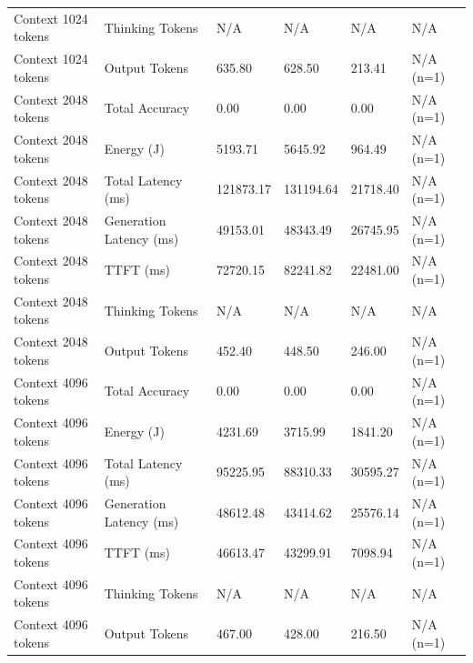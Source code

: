 \begin{table}
\begin{tabular}{llllll}
Context 1024 tokens & Thinking Tokens & N/A & N/A & N/A & N/A \\
Context 1024 tokens & Output Tokens & 635.80 & 628.50 & 213.41 & N/A (n=1) \\
Context 2048 tokens & Total Accuracy & 0.00 & 0.00 & 0.00 & N/A (n=1) \\
Context 2048 tokens & Energy (J) & 5193.71 & 5645.92 & 964.49 & N/A (n=1) \\
Context 2048 tokens & Total Latency (ms) & 121873.17 & 131194.64 & 21718.40 & N/A (n=1) \\
Context 2048 tokens & Generation Latency (ms) & 49153.01 & 48343.49 & 26745.95 & N/A (n=1) \\
Context 2048 tokens & TTFT (ms) & 72720.15 & 82241.82 & 22481.00 & N/A (n=1) \\
Context 2048 tokens & Thinking Tokens & N/A & N/A & N/A & N/A \\
Context 2048 tokens & Output Tokens & 452.40 & 448.50 & 246.00 & N/A (n=1) \\
Context 4096 tokens & Total Accuracy & 0.00 & 0.00 & 0.00 & N/A (n=1) \\
Context 4096 tokens & Energy (J) & 4231.69 & 3715.99 & 1841.20 & N/A (n=1) \\
Context 4096 tokens & Total Latency (ms) & 95225.95 & 88310.33 & 30595.27 & N/A (n=1) \\
Context 4096 tokens & Generation Latency (ms) & 48612.48 & 43414.62 & 25576.14 & N/A (n=1) \\
Context 4096 tokens & TTFT (ms) & 46613.47 & 43299.91 & 7098.94 & N/A (n=1) \\
Context 4096 tokens & Thinking Tokens & N/A & N/A & N/A & N/A \\
Context 4096 tokens & Output Tokens & 467.00 & 428.00 & 216.50 & N/A (n=1) \\
\bottomrule
\end{tabular}
\end{table}
